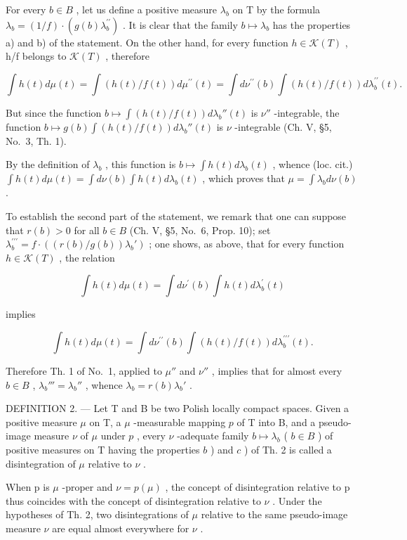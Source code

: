 For every \(b \in B\) , let us define a positive measure \(\lambda_{b}\) on T by the formula \(\lambda_{b} = (1/f) \cdot (g(b)\lambda_{b}^{\prime\prime})\) . It is clear that the family \(b \mapsto \lambda_{b}\) has the properties a) and b) of the statement. On the other hand, for every function \(h \in \mathcal{K}(T)\) , h/f belongs to \(\mathcal{K}(T)\) , therefore

\[
\int h (t) d \mu (t) = \int \left(h (t) / f (t)\right) d \mu^ {\prime \prime} (t) = \int d \nu^ {\prime \prime} (b) \int \left(h (t) / f (t)\right) d \lambda_ {b} ^ {\prime \prime} (t).
\]

But since the function \(b \mapsto \int (h(t) / f(t)) d\lambda_b''(t)\) is \(\nu''\) -integrable, the function \(b \mapsto g(b) \int (h(t) / f(t)) d\lambda_b''(t)\) is \(\nu\) -integrable (Ch. V, §5, No.~3, Th. 1).

By the definition of \(\lambda_b\) , this function is \(b \mapsto \int h(t) d\lambda_b(t)\) , whence (loc. cit.) \(\int h(t) d\mu(t) = \int d\nu(b) \int h(t) d\lambda_b(t)\) , which proves that \(\mu = \int \lambda_b d\nu(b)\) .

To establish the second part of the statement, we remark that one can suppose that \(r(b) > 0\) for all \(b \in B\) (Ch. V, §5, No.~6, Prop. 10); set \(\lambda_b^{\prime \prime \prime} = f \cdot \left( \left( r(b) / g(b) \right) \lambda_b' \right)\) ; one shows, as above, that for every function \(h \in \mathcal{K}(T)\) , the relation

\[
\int h (t) d \mu (t) = \int d \nu^ {\prime} (b) \int h (t) d \lambda_ {b} ^ {\prime} (t)
\]

implies

\[
\int h (t) d \mu (t) = \int d \nu^ {\prime \prime} (b) \int \left(h (t) / f (t)\right) d \lambda_ {b} ^ {\prime \prime \prime} (t).
\]

Therefore Th. 1 of No.~1, applied to \(\mu''\) and \(\nu''\) , implies that for almost every \(b \in B\) , \(\lambda_b''' = \lambda_b''\) , whence \(\lambda_b = r(b)\lambda_b'\) .

DEFINITION 2. --- Let T and B be two Polish locally compact spaces. Given a positive measure \(\mu\) on T, a \(\mu\) -measurable mapping \(p\) of T into B, and a pseudo-image measure \(\nu\) of \(\mu\) under \(p\) , every \(\nu\) -adequate family \(b \mapsto \lambda_b\) ( \(b \in B\) ) of positive measures on T having the properties \(b\) ) and \(c\) ) of Th. 2 is called a disintegration of \(\mu\) relative to \(\nu\) .

When p is \(\mu\) -proper and \(\nu = p(\mu)\) , the concept of disintegration relative to p thus coincides with the concept of disintegration relative to \(\nu\) . Under the hypotheses of Th. 2, two disintegrations of \(\mu\) relative to the same pseudo-image measure \(\nu\) are equal almost everywhere for \(\nu\) .

